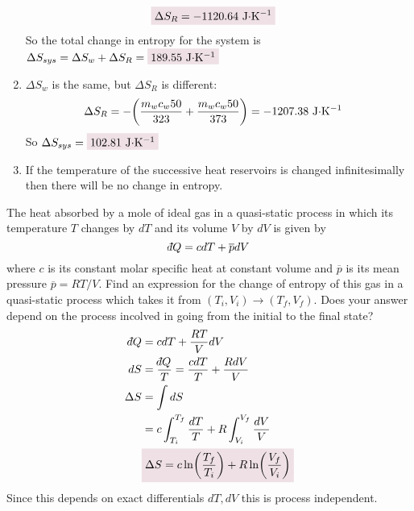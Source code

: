 \documentclass{article}
\def\dbar{{\mathchar'26\mkern-12mu d}} %
\begin{document}
\begin{problem}[Reif 4.1]
\begin{enumerate}[label=\alph*)]
\begin{align*}
                &\coloredanswer{\Delta S_R=-1120.64\ \text{J$\cdot$K$^{-1}$}}
            \end{align*}
            So the total change in entropy for the system is $\Delta S_{sys}=\Delta S_w+\Delta S_R=\coloredanswer{189.55\ \text{J$\cdot$K$^{-1}$}}$
            \item $\Delta S_w$ is the same, but $\Delta S_R$ is different: 
            \begin{align*}
                \Delta S_R&=-\qty(\frac{m_wc_w50}{323}+\frac{m_wc_w50}{373})=-1207.38\ \text{J$\cdot$K$^{-1}$}
            \end{align*}
            So $\Delta S_{sys}=\coloredanswer{102.81\ \text{J$\cdot$K$^{-1}$}}$
            \item If the temperature of the successive heat reservoirs is changed infinitesimally then there will be no change in entropy. 
        \end{enumerate}
    \end{problem}\newpage
    \begin{problem}[Reif 4.3]
        The heat absorbed by a mole of ideal gas in a quasi-static process in which its temperature $T$ changes by $dT$ and its volume $V$ by $dV$ is given by $$\dbar Q=cdT+\overline{p}dV$$ where $c$ is its constant molar specific heat at constant volume and $\overline{p}$ is its mean pressure $\overline{p}=RT/V$. Find an expression for the change of entropy of this gas in a quasi-static process which takes it from $(T_i,V_i)\rightarrow(T_f,V_f)$. Does your answer depend on the process incolved in going from the initial to the final state?
        \answerline
        \begin{align*}
            \dbar Q &=cdT+\frac{RT}{V}dV
            \\
            dS &= \frac{\dbar Q}{T}=\frac{cdT}{T}+\frac{RdV}{V}
            \\
            \Delta S&=\int dS
            \\
            &= c\int_{T_i}^{T_f}\frac{dT}{T}+R\int_{V_i}^{V_f}\frac{dV}{V}
            \\
            &\coloredanswer{\Delta S= c\ln(\frac{T_f}{T_i})+R\ln(\frac{V_f}{V_i})}
        \end{align*}
        Since this depends on exact differentials $dT,dV$ this is process independent. 
    \end{problem}\newpage
\end{document}
